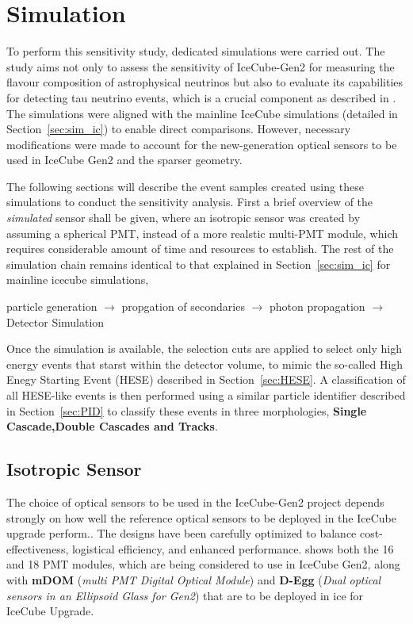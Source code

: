\section{Simulation}
\label{sec:gen2-sim}
To perform this sensitivity study, dedicated simulations were carried out. The study aims not only to assess the sensitivity of IceCube-Gen2 for measuring the flavour composition of astrophysical neutrinos but also to evaluate its capabilities for detecting tau neutrino events, which is a crucial component as described in . The simulations were aligned with the mainline IceCube simulations (detailed in Section~\ref{sec:sim_ic}) to enable direct comparisons. However, necessary modifications were made to account for the new-generation optical sensors to be used in IceCube Gen2 and the sparser geometry. 

The following sections will describe the event samples created using these simulations to conduct the sensitivity analysis. First a brief overview of the \emph{simulated} sensor shall be given, where an isotropic sensor was created by assuming a spherical PMT, instead of a more realstic multi-PMT module, which requires considerable amount of time and resources to establish. The rest of the simulation chain remains identical to that explained in Section~\ref{sec:sim_ic} for mainline icecube simulations,
\begin{kaobox}
    particle generation $\rightarrow$ propgation of secondaries $\rightarrow$ photon propagation $\rightarrow$ Detector Simulation 
\end{kaobox}
Once the simulation is available, the selection cuts are applied to select only high energy events that starst within the detector volume, to mimic the so-called High Enegy Starting Event (HESE) described in Section~\ref{sec:HESE}. A classification of all HESE-like events is then performed using a similar particle identifier described in Section~\ref{sec:PID} to classify these events in three morphologies, \textbf{Single Cascade,Double Cascades and Tracks}. 
\subsection{Isotropic Sensor}
\label{sec:isopdom}
The choice of optical sensors to be used in the IceCube-Gen2 project depends strongly on how well the reference optical sensors to be deployed in the IceCube upgrade perform.. The designs have been carefully optimized to balance cost-effectiveness, logistical efficiency, and enhanced performance.  shows both the 16 and 18 PMT modules, which are being considered to use in IceCube Gen2, along with \textbf{mDOM} (\emph{multi PMT Digital Optical Module})  and \textbf{D-Egg} (\emph{Dual optical sensors in an Ellipsoid Glass for Gen2})  that are to be deployed in ice for IceCube Upgrade.

